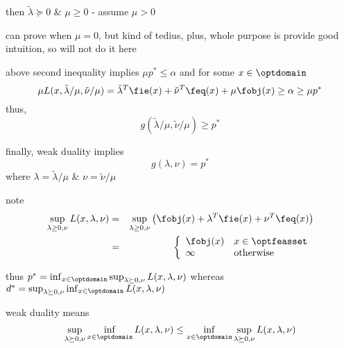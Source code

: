 \documentclass[17pt,landscape]{foils}
\begin{document}
{\item
	then $\tilde{\lambda} \succeq 0$ \& $\mu\geq0$ - assume $\mu>0$
	\bit
	\item
		can prove when $\mu=0$, but kind of tedius, plus,
		whole purpose is provide good intuition,
		so will not do it here
	\eit

\item
	above second inequality implies $\mu p^\ast \leq \alpha$ and
	for some $x\in\optdomain$\
	$$
		\mu L(x,\tilde{\lambda}/\mu, \tilde{\nu}/\mu)
		=
		\tilde{\lambda}^T \fie(x) + \tilde{\nu}^T \feq(x) + \mu \fobj(x) \geq \alpha \geq \mu p^\ast
	$$
	thus,
	$$
		g(\tilde{\lambda}/\mu, \tilde{\nu}/\mu) \geq p^\ast
	$$

\item
	finally, weak duality implies
	$$
		g(\lambda,\nu) = p^\ast
	$$
	where $\lambda = \tilde{\lambda}/\mu$ \& $\nu = \tilde{\nu}/\mu$
\eit

\begin{figure}
\begin{center}
	\dualitygraphfour{\dualitygraphunitsize}
	\label{fig:geometric interpretation of duality - 4}
\end{center}
\end{figure}



\bit
\item
	note
	\shrinkspacewithintheoremslike
	\begin{eqnarray*}
		\sup_{\lambda\geq 0, \nu} L(x,\lambda,\nu)
		&=&
		\sup_{\lambda\geq 0, \nu} \left(
			\fobj(x) + \lambda^T \fie(x) + \nu^T \feq(x)
		\right)
		\\
		&
		=
		&
		\left\{\begin{array}{ll}
			\fobj(x) & x\in\optfeasset
			\\
			\infty & \mbox{otherwise}
		\end{array}\right.
	\end{eqnarray*}

\vitem
	thus
	$
		p^\ast = \inf_{x\in\optdomain} \sup_{\lambda\succeq 0, \nu} L(x,\lambda,\nu)
	$
	whereas
	$
		d^\ast = \sup_{\lambda\succeq 0,\nu} \inf_{x\in\optdomain} L(x,\lambda,\nu)
	$

\vitem
	weak duality means
	$$
		\sup_{\lambda\succeq 0, \nu} \inf_{x\in\optdomain} L(x,\lambda,\nu)
		\leq
		\inf_{x\in\optdomain} \sup_{\lambda\succeq 0, \nu} L(x,\lambda,\nu)
	$$

}
\end{document}
